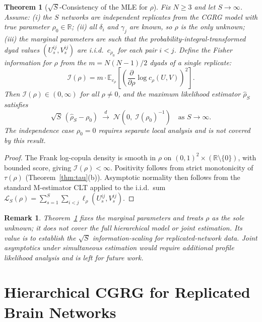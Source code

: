 \documentclass[12pt]{article}
\newtheorem{theorem}{Theorem}[section]
\newtheorem{remark}{Remark}[section]
\begin{document}
\begin{theorem}[$\sqrt{S}$-Consistency of the MLE for $\rho$]
\label{thm:mle}
Fix $N \geq 3$ and let $S \to \infty$.  Assume: (i) the $S$ networks are
independent replicates from the CGRG model with true parameter
$\rho_0 \in \mathbb{R}$; (ii) all $\delta_i$ and $\gamma_j$ are
known, so $\rho$ is the only unknown; (iii) the marginal parameters are such
that the probability-integral-transformed dyad values $(U_s^{ij},V_s^{ij})$
are i.i.d.\ $c_{\rho_0}$ for each pair $i < j$.  Define the Fisher information
for $\rho$ from the $m = N(N-1)/2$ dyads of a single replicate:
\[
\mathcal{I}(\rho)
  = m \cdot \mathbb{E}_{c_\rho}\!\left[
    \left(\frac{\partial}{\partial\rho}\log c_\rho(U,V)\right)^{\!2}
    \right].
\]
Then $\mathcal{I}(\rho) \in (0,\infty)$ for all $\rho \neq 0$, and the
maximum likelihood estimator $\hat\rho_S$ satisfies
\[
\sqrt{S}\,(\hat\rho_S - \rho_0)
  \;\xrightarrow{d}\; \mathcal{N}\!\left(0,\;
    \mathcal{I}(\rho_0)^{-1}\right)
\quad \text{as } S \to \infty.
\]
The independence case $\rho_0 = 0$ requires separate local analysis
and is not covered by this result.
\end{theorem}

\begin{proof}
The Frank log-copula density is smooth in $\rho$ on $(0,1)^2 \times
(\mathbb{R}\setminus\{0\})$, with bounded score, giving
$\mathcal{I}(\rho) < \infty$.  Positivity follows from strict monotonicity
of $\tau(\rho)$ (Theorem~\ref{thm:tau}(b)).  Asymptotic normality then
follows from the standard M-estimator CLT \citep[Theorem~5.41]{vandervaart98}
applied to the i.i.d.\ sum $\mathcal{L}_S(\rho) =
\sum_{s=1}^{S}\sum_{i<j}\ell_\rho(U_s^{ij},V_s^{ij})$.
\end{proof}

\begin{remark}
Theorem~\ref{thm:mle} fixes the marginal parameters and treats $\rho$ as
the sole unknown; it does not cover the full hierarchical model or joint
estimation.  Its value is to establish the $\sqrt{S}$ information-scaling
for replicated-network data.  Joint asymptotics under simultaneous estimation
would require additional profile likelihood analysis and is left for future
work.
\end{remark}


\section{Hierarchical CGRG for Replicated Brain Networks}
\label{sec:cgrg_brain}
\end{document}

